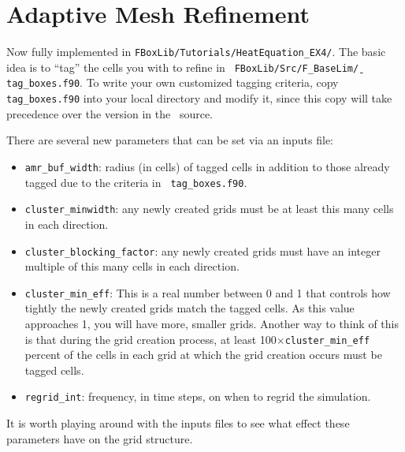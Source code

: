 \section{Adaptive Mesh Refinement}\label{Sec:AMR}
Now fully implemented in {\tt FBoxLib/Tutorials/HeatEquation\_EX4/}.
The basic idea is to ``tag'' the cells you with to refine in {\tt
  FBoxLib/Src/F\_BaseLim\b/tag\_boxes.f90}.  To write your own
customized tagging criteria, copy {\tt tag\_boxes.f90} into your local
directory and modify it, since this copy will take precedence over the
version in the \FBoxLib~source.

There are several new
parameters that can be set via an inputs file:
\begin{itemize}
\item {\tt amr\_buf\_width}: radius (in cells) of tagged cells in
  addition to those already tagged due to the criteria in {\tt
    tag\_boxes.f90}.
\item {\tt cluster\_minwidth}: any newly created grids must be at
  least this many cells in each direction.
\item {\tt cluster\_blocking\_factor}: any newly created grids must
  have an integer multiple of this many cells in each direction.
\item {\tt cluster\_min\_eff}: This is a real number between 0 and 1
  that controls how tightly the newly created grids match the tagged
  cells.  As this value approaches 1, you will have more, smaller
  grids.  Another way to think of this is that during the grid
  creation process, at least 100$\times${\tt cluster\_min\_eff}
  percent of the cells in each grid at which the grid creation occurs
  must be tagged cells.
\item {\tt regrid\_int}: frequency, in time steps, on when to regrid
  the simulation.
\end{itemize}
It is worth playing around with the inputs files to see what effect
these parameters have on the grid structure.

